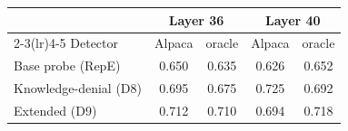 \begin{tabular}{@{}l cccc@{}}
\toprule
 & \multicolumn{2}{c}{Layer 36} & \multicolumn{2}{c}{Layer 40} \\
\cmidrule(lr){2-3}\cmidrule(lr){4-5}
Detector & Alpaca & oracle & Alpaca & oracle \\
\midrule
Base probe (RepE) & 0.650 & 0.635 & 0.626 & 0.652 \\
Knowledge-denial (D8) & 0.695 & 0.675 & 0.725 & 0.692 \\
Extended (D9) & 0.712 & 0.710 & 0.694 & 0.718 \\
\bottomrule
\end{tabular}
